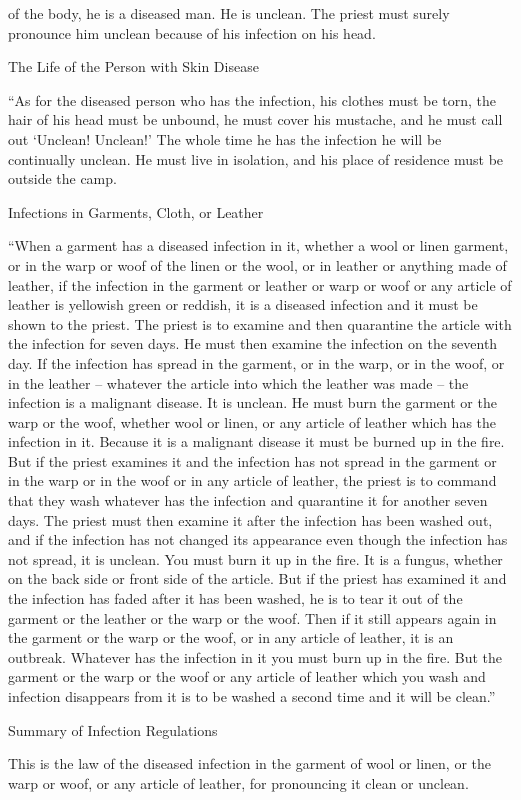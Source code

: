 {of the body,
he is a diseased
man.
He is unclean.
The priest
must surely pronounce him unclean because
of his infection
on his head.
\par }{\SH The Life of the Person with Skin Disease
\par }{\PP {}“As for the diseased person
who
has the infection,
his clothes
must be
torn,
the hair of his head
must be
unbound,
he must cover
his mustache,
and he must call
out ‘Unclean! Unclean!’
The whole
time
he has the infection
he will be continually unclean.
He
must live
in isolation,
and his place of residence
must be outside
the camp.
\par }{\SH Infections in Garments, Cloth, or Leather
\par }{\PP {}“When
a garment
has a diseased
infection
in it, whether a wool
or
linen
garment,
or
in the warp
or
woof
of the linen
or the wool,
or
in leather
or
anything
made
of leather,
if the infection
in the garment
or
leather
or
warp
or
woof
or
any
article
of leather
is yellowish green
or
reddish,
it is a diseased
infection
and it must be shown
to the priest.
The priest
is to examine
and then quarantine
the article with the infection
for seven
days.
He must then examine
the infection
on the seventh
day.
If
the infection
has spread
in the garment,
or
in the warp,
or
in the woof,
or
in the leather
– whatever
the article into which
the leather
was made –
the infection
is a malignant
disease.
It is
unclean.
He must burn
the garment
or
the warp
or
the woof,
whether wool
or
linen,
or
any
article
of leather
which
has the infection
in it. Because
it is a malignant
disease
it
must be burned up
in the fire.
But if
the priest
examines
it and
the infection
has not
spread
in the garment
or
in the warp
or
in the woof
or
in any
article
of leather,
the priest
is to command
that they wash
whatever
has the infection
and quarantine
it for another
seven
days.
The priest
must then examine
it after
the
infection
has been washed out,
and if
the infection
has not
changed
its appearance
even though the infection
has not
spread,
it is unclean.
You must burn
it up
in the fire.
It is
a fungus,
whether on the back side
or
front side of the article.
But if
the priest
has examined
it and
the infection
has faded
after
it has been washed,
he is to tear
it out of
the garment
or
the leather
or
the warp
or
the woof.
Then if
it still appears
again
in the garment
or
the warp
or
the woof,
or
in any
article
of leather,
it is an outbreak.
Whatever has the infection
in it you must burn up
in the fire.
But the garment
or
the warp
or
the woof
or
any
article
of leather
which
you wash
and infection
disappears
from it is to be washed
a second
time and it will be clean.”
\par }{\SH Summary of Infection Regulations
\par }{\PP {}This
is the law
of the diseased
infection
in the garment
of wool
or
linen,
or
the warp
or
woof,
or
any
article
of leather,
for pronouncing it clean
or
unclean.

}
